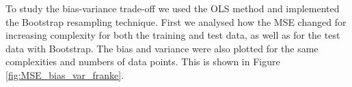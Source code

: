 \documentclass[norsk,a4paper,12pt]{article}
\begin{document}
\begin{multicols}{2}
To study the bias-variance trade-off we used the OLS method and implemented the Bootstrap resampling technique. First we analysed how the MSE changed for increasing complexity for both the training and test data, as well as for the test data with Bootstrap. The bias and variance were also plotted for the same complexities and numbers of data points. This is shown in Figure \ref{fig:MSE_bias_var_franke}.




\end{multicols}
\end{document}
